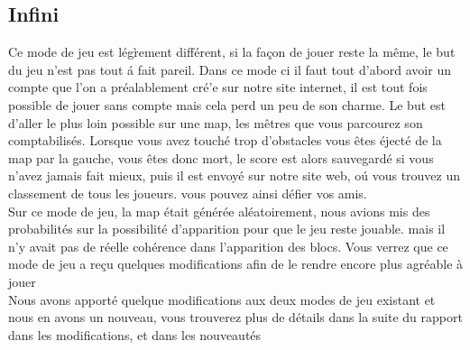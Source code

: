 \documentclass [11pt]{report}
\begin{document}
		\subsection{Infini}
			Ce mode de jeu est l\'eg\`rement diff\'erent, si la façon de jouer reste la m\^eme, le but du jeu n'est pas tout \'a fait pareil. Dans ce mode ci il faut tout d'abord avoir un compte que l'on a pr\'ealablement cr\'e'e sur notre site internet, il est tout fois possible de jouer sans compte mais cela perd un peu de son charme. Le but est d'aller le plus loin possible sur une map, les m\^etres que vous parcourez son comptabilis\'es. Lorsque vous avez touch\'e trop d'obstacles vous \^etes \'eject\'e de la map par la gauche, vous \^etes donc mort, le score est alors sauvegard\'e si vous n'avez jamais fait mieux, puis il est envoy\'e sur notre site web, o\'u vous trouvez un classement de tous les joueurs. vous pouvez ainsi d\'efier vos amis. \\
			\indent Sur ce mode de jeu, la map \'etait g\'en\'er\'ee al\'eatoirement, nous avions mis des probabilit\'es sur la possibilit\'e d'apparition pour que le jeu reste jouable. mais il n'y avait pas de r\'eelle coh\'erence dans l'apparition des blocs. Vous verrez que ce mode de jeu a reçu quelques modifications afin de le rendre encore plus agr\'eable \`a jouer\\
			\indent Nous avons apport\'e quelque modifications aux deux modes de jeu existant et nous en avons un nouveau, vous trouverez plus de d\'etails dans la suite du rapport dans les modifications, et dans les nouveaut\'es
\end{document}
